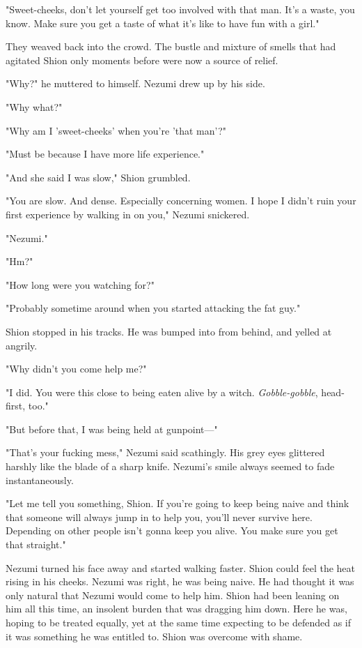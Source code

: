 "Sweet-cheeks, don't let yourself get too involved with that man. It's a
waste, you know. Make sure you get a taste of what it's like to have fun
with a girl."

They weaved back into the crowd. The bustle and mixture of smells that
had agitated Shion only moments before were now a source of relief.

"Why?" he muttered to himself. Nezumi drew up by his side.

"Why what?"

"Why am I 'sweet-cheeks' when you're 'that man'?"

"Must be because I have more life experience."

"And she said I was slow," Shion grumbled.

"You are slow. And dense. Especially concerning women. I hope I didn't
ruin your first experience by walking in on you," Nezumi snickered.

"Nezumi."

"Hm?"

"How long were you watching for?"

"Probably sometime around when you started attacking the fat guy."

Shion stopped in his tracks. He was bumped into from behind, and yelled
at angrily.

"Why didn't you come help me?"

"I did. You were this close to being eaten alive by a witch.
\emph{Gobble-gobble}, head-first, too."

"But before that, I was being held at gunpoint---"

"That's your fucking mess," Nezumi said scathingly. His grey eyes
glittered harshly like the blade of a sharp knife. Nezumi's smile always
seemed to fade instantaneously.

"Let me tell you something, Shion. If you're going to keep being naive
and think that someone will always jump in to help you, you'll never
survive here. Depending on other people isn't gonna keep you alive. You
make sure you get that straight."

Nezumi turned his face away and started walking faster. Shion could feel
the heat rising in his cheeks. Nezumi was right, he was being naive. He
had thought it was only natural that Nezumi would come to help him.
Shion had been leaning on him all this time, an insolent burden that was
dragging him down. Here he was, hoping to be treated equally, yet at the
same time expecting to be defended as if it was something he was
entitled to. Shion was overcome with shame.

